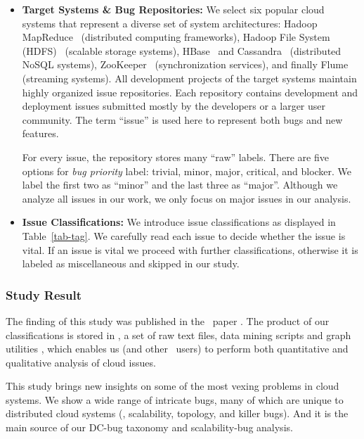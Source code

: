 \begin{itemize}

\item {\bf Target Systems \& Bug Repositories:} We select six popular cloud
systems that represent a diverse set of system architectures: Hadoop
MapReduce~\cite{HadoopWeb} (distributed computing frameworks), Hadoop File
System (HDFS)~\cite{HDFSWeb} (scalable storage systems), HBase~\cite{HBaseWeb}
and Cassandra~\cite{CassandraWeb} (distributed NoSQL systems),
ZooKeeper~\cite{ZooKeeperWeb} (synchronization services), and finally
Flume~\cite{FlumeWeb} (streaming systems).
%
All development projects of the target systems maintain highly organized issue
repositories.
%
Each repository contains development and deployment issues submitted mostly by
the developers or a larger user community. The term ``issue'' is used here to
represent both bugs and new features.

For every issue, the repository stores many ``raw'' labels. There are five
options for {\em bug priority} label: trivial, minor, major, critical, and
blocker. We label the first two as ``minor'' and the last three as ``major''.
Although we analyze all issues in our work, we only focus on major issues in
our analysis.
\fi

\item {\bf Issue Classifications:} We introduce issue classifications as
displayed in Table~\ref{tab-tag}. 
%
We carefully read each issue to decide whether the issue is vital. If an issue
is vital we proceed with further classifications, otherwise it is labeled as
miscellaneous and skipped in our study. 

\end{itemize}

\subsubsection{Study Result}

The finding of this study was published in the \cbs\ paper \cite{Gunawi+14-Cbs}.
The product of our classifications is stored in \cdb, a set of raw text files,
data mining scripts and graph utilities \cite{CBS}, which enables us (and other
\cdb\ users) to perform both quantitative and qualitative analysis of cloud
issues. 

This study brings new insights on some of the most vexing problems in cloud
systems. We show a wide range of intricate bugs, many of which are unique to
distributed cloud systems (\eg, scalability, topology, and killer bugs). And it
is the main source of our DC-bug taxonomy and scalability-bug analysis.

